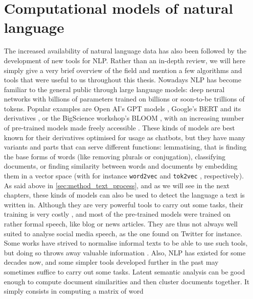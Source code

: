 \documentclass[../thesis.tex]{subfiles}
\begin{document}
\section{Computational models of natural language}
The increased availability of natural language data has also been followed by the
development of new tools for \ac{NLP}. Rather than an in-depth review, we will here
simply give a very brief overview of the field and mention a few algorithms and tools
that were useful to us throughout this thesis. Nowadays \ac{NLP} has become familiar to
the general public through large language models: deep neural networks with billions of
parameters trained on billions or soon-to-be trillions of tokens. Popular examples are
Open AI's GPT models \cite{BrownLanguageModels2020}, Google's BERT
\cite{DevlinBERTPretraining2019} and its derivatives \cite{SanhDistilBERTDistilled2020},
or the BigScience workshop's BLOOM \cite{WorkshopBLOOM176BParameter2022}, with an
increasing number of pre-trained models made freely accessible
\cite{WolfTransformersStateoftheArt2020,MontaniExplosionSpaCy2023}. These kinds of
models are best known for their derivatives optimised for usage as chatbots, but they
have many variants and parts that can serve different functions: lemmatising, that is
finding the base forms of words (like removing plurals or conjugation), classifying
documents, or finding similarity between words and documents by embedding them in a
vector space (with for instance \texttt{word2vec} \cite{MikolovEfficientEstimation2013}
and \texttt{tok2vec} \cite{AngelovTop2VecDistributed2020}, respectively). As said above
in \cref{sec:method_text_process}, and as we will see in the next chapters, these kinds
of models can also be used to detect the language a text is written in. Although they
are very powerful tools to carry out some tasks, their training is very costly
\cite{AnanthaswamyAIBigger2023}, and most of the pre-trained models were trained on
rather formal speech, like blog or news articles. They are thus not always well suited
to analyse social media speech, as the one found on Twitter for instance. Some works
have strived to normalise informal texts to be able to use such tools, but doing so
throws away valuable information \cite{EisensteinWhatBad2013}. Also, \ac{NLP} has
existed for some decades now, and some simpler tools developed further in the past may
sometimes suffice to carry out some tasks. Latent semantic analysis
\cite{DumaisLatentSemantic2004} can be good enough to compute document similarities and
then cluster documents together. It simply consists in computing a matrix of word
\end{document}
